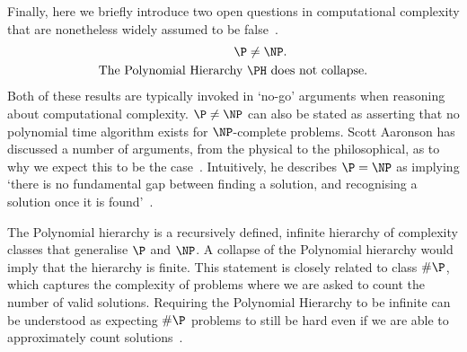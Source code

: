Finally, here we briefly introduce two open questions in computational complexity that are nonetheless widely assumed to be false~\cite{Nielsen2000}.
\begin{align}
    \P &\neq\NP.\\
    \text{The Polynomial Hierarchy } &\PH \text{ does not collapse.}
\end{align}
Both of these results are typically invoked in `no-go' arguments when reasoning about computational complexity. $\P\neq \NP$ can also be stated as asserting that no polynomial time algorithm exists for $\NP$-complete problems. Scott Aaronson has discussed a number of arguments, from the physical to the philosophical, as to why we expect this to be the case~\cite{Aaronson2005,Aaronson2006}. Intuitively, he describes $\P=\NP$ as implying `there is no fundamental gap between finding a solution, and recognising a solution once it is found'~\cite{Aaronson2006}.\par
The Polynomial hierarchy is a recursively defined, infinite hierarchy of complexity classes that generalise $\P$ and $\NP$. A collapse of the Polynomial hierarchy would imply that the hierarchy is finite. This statement is closely related to class $\#\P$, which captures the complexity of problems where we are asked to count the number of valid solutions. Requiring the Polynomial Hierarchy to be infinite can be understood as expecting $\#\P$ problems to still be hard even if we are able to approximately count solutions~\cite{Dalzell2017}.
